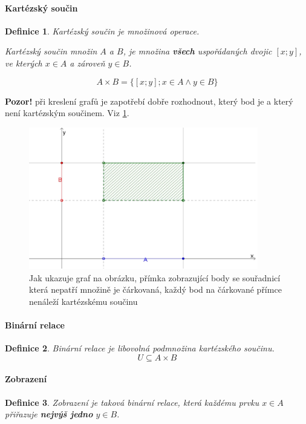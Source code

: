 \documentclass[12pt,a4wide,oneside,
headings]{report}
\newtheorem{defi}{Definice}[chapter]\theoremstyle{definition}
\begin{document}
\paragraph{Kartézský součin}
\begin{defi}
Kartézský součin je množinová operace.

Kartézský součin množin $A$ a $B$, je množina \textbf{všech} uspořádaných dvojic $\left[ x;y \right]$, ve kterých $x \in A$ a zároveň $y\in B$.

$$ A\times B=\lbrace\left[x;y\right]; x\in A \wedge y\in B \rbrace $$

\end{defi}
\textbf{Pozor!} při kreslení grafů je zapotřebí dobře rozhodnout, který bod je a který není kartézským součinem. Viz \ref{fig:kartsoucin}. 
\begin{figure}[h!]
 \includegraphics[width=10cm]{souhrn/fce/bin_soucin.pdf}
 \centering
 \caption[kartézský součin graficky]{Jak ukazuje graf na obrázku, přímka zobrazující body se souřadnicí která nepatří množině je čárkovaná, každý bod na čárkované přímce nenáleží kartézskému součinu}
\label{fig:kartsoucin}
\end{figure}

\paragraph{Binární relace}
\begin{defi}
Binární relace je libovolná podmnožina kartézského součinu.
$$ U\subseteq A\times B $$
\end{defi}
\paragraph{Zobrazení}
\begin{defi}
Zobrazení je taková binární relace, která každému prvku $x\in A$ přiřazuje \textbf{nejvýš jedno} $y\in B$.
\end{defi}
\end{document}
